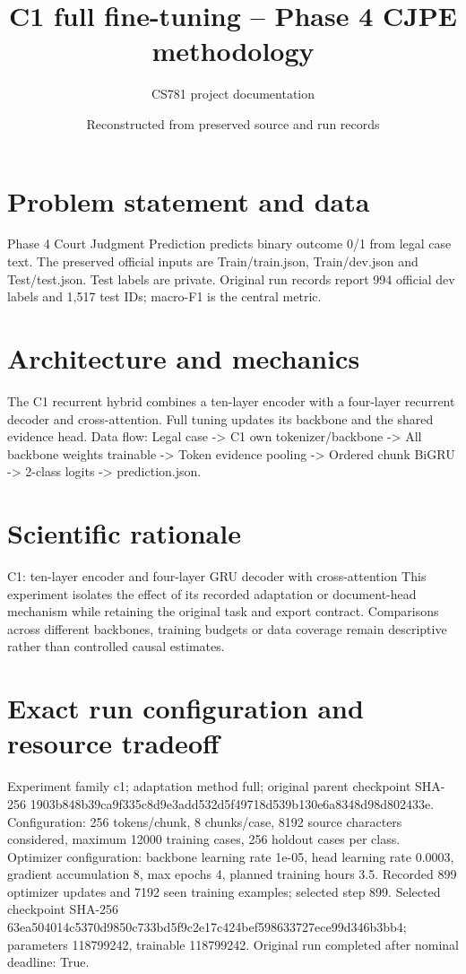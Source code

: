 \documentclass[11pt,a4paper]{article}
\begin{document}
\title{C1 full fine-tuning -- Phase 4 CJPE methodology}
\author{CS781 project documentation}
\date{Reconstructed from preserved source and run records}
\maketitle
\section{Problem statement and data}
Phase 4 Court Judgment Prediction predicts binary outcome 0/1 from legal case text. The preserved official inputs are Train/train.json, Train/dev.json and Test/test.json. Test labels are private. Original run records report 994 official dev labels and 1,517 test IDs; macro-F1 is the central metric.
\section{Architecture and mechanics}
The C1 recurrent hybrid combines a ten-layer encoder with a four-layer recurrent decoder and cross-attention. Full tuning updates its backbone and the shared evidence head. Data flow: Legal case -> C1 own tokenizer/backbone -> All backbone weights trainable -> Token evidence pooling -> Ordered chunk BiGRU -> 2-class logits -> prediction.json.
\section{Scientific rationale}
C1: ten-layer encoder and four-layer GRU decoder with cross-attention This experiment isolates the effect of its recorded adaptation or document-head mechanism while retaining the original task and export contract. Comparisons across different backbones, training budgets or data coverage remain descriptive rather than controlled causal estimates.
\section{Exact run configuration and resource tradeoff}
Experiment family c1; adaptation method full; original parent checkpoint SHA-256 1903b848b39ca9f335c8d9e3add532d5f49718d539b130e6a8348d98d802433e. Configuration: 256 tokens/chunk, 8 chunks/case, 8192 source characters considered, maximum 12000 training cases, 256 holdout cases per class. Optimizer configuration: backbone learning rate 1e-05, head learning rate 0.0003, gradient accumulation 8, max epochs 4, planned training hours 3.5. Recorded 899 optimizer updates and 7192 seen training examples; selected step 899. Selected checkpoint SHA-256 63ea504014c5370d9850c733bd5f9c2e17c424bef598633727ece99d346b3bb4; parameters 118799242, trainable 118799242. Original run completed after nominal deadline: True.
\end{document}
